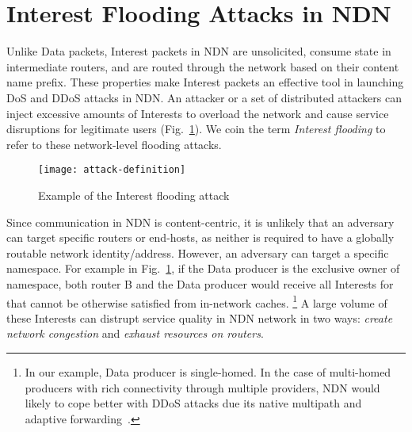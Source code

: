 \section{Interest Flooding Attacks in NDN}
\label{sec:interest flooding}




Unlike Data packets, Interest packets in NDN are unsolicited, consume state in intermediate routers, and are routed through the network based on their content name prefix. These properties make Interest packets an effective tool in launching DoS and DDoS attacks in NDN. An attacker or a set of distributed attackers can inject excessive amounts of Interests to overload the network and cause service disruptions for legitimate users (Fig.~\ref{fig:flooding example}). We coin the term \emph{Interest flooding} to refer to these network-level flooding attacks.

\begin{figure}[htbp]
  \centering
  \texttt{[image: attack-definition]}
  \caption{Example of the Interest flooding attack}
  \label{fig:flooding example}
\end{figure}


Since communication in NDN is content-centric, it is unlikely that an adversary can target specific routers or end-hosts, as neither is required to have a globally routable network identity/address. However, an adversary can target a specific namespace.
For example in Fig.~\ref{fig:flooding example}, if the Data producer is the exclusive owner of  namespace, both router B and the Data producer would receive all Interests for  that cannot be otherwise satisfied from in-network caches.%
\footnote {In our example, Data producer is single-homed. In the case of multi-homed producers with rich connectivity through multiple providers, NDN would likely to cope better with DDoS attacks due its native multipath and adaptive forwarding~\cite{adaptive-forwarding}.}
A large volume of these Interests can distrupt service quality in NDN network in two ways: \emph{create network congestion} and \emph{exhaust resources on routers}.

